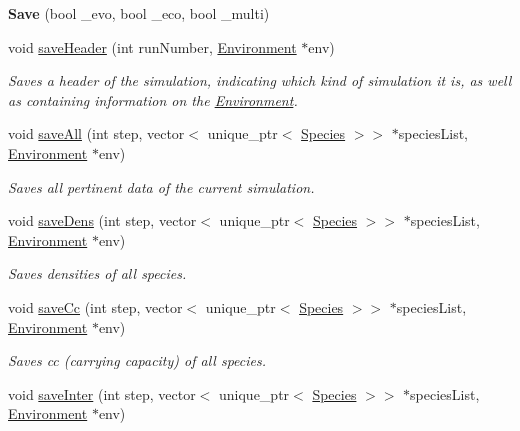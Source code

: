 \begin{DoxyCompactItemize}
\item 
\mbox{\label{classSave_af60832ca49a38a2569cc78182a2fe8e8}} 
{\bfseries Save} (bool \+\_\+evo, bool \+\_\+eco, bool \+\_\+multi)
\item 
\mbox{\label{classSave_aa59686b2d793182bb2f2d5997f4f5927}} 
void \hyperlink{classSave_aa59686b2d793182bb2f2d5997f4f5927}{save\+Header} (int run\+Number, \hyperlink{classEnvironment}{Environment} $\ast$env)
\begin{DoxyCompactList}\small\item\em Saves a header of the simulation, indicating which kind of simulation it is, as well as containing information on the \hyperlink{classEnvironment}{Environment}. \end{DoxyCompactList}\item 
void \hyperlink{classSave_ae3cf638e17bf975565ccdd5188a5c156}{save\+All} (int step, vector$<$ unique\+\_\+ptr$<$ \hyperlink{classSpecies}{Species} $>$$>$ $\ast$species\+List, \hyperlink{classEnvironment}{Environment} $\ast$env)
\begin{DoxyCompactList}\small\item\em Saves all pertinent data of the current simulation. \end{DoxyCompactList}\item 
void \hyperlink{classSave_a2e80fc292e7fcea2b327bc7016f34331}{save\+Dens} (int step, vector$<$ unique\+\_\+ptr$<$ \hyperlink{classSpecies}{Species} $>$$>$ $\ast$species\+List, \hyperlink{classEnvironment}{Environment} $\ast$env)
\begin{DoxyCompactList}\small\item\em Saves densities of all species. \end{DoxyCompactList}\item 
void \hyperlink{classSave_a76a537b2f22ae64e63ffaf00e625b955}{save\+Cc} (int step, vector$<$ unique\+\_\+ptr$<$ \hyperlink{classSpecies}{Species} $>$$>$ $\ast$species\+List, \hyperlink{classEnvironment}{Environment} $\ast$env)
\begin{DoxyCompactList}\small\item\em Saves cc (carrying capacity) of all species. \end{DoxyCompactList}\item 
void \hyperlink{classSave_af446df59d19910cd6042680d419b3948}{save\+Inter} (int step, vector$<$ unique\+\_\+ptr$<$ \hyperlink{classSpecies}{Species} $>$$>$ $\ast$species\+List, \hyperlink{classEnvironment}{Environment} $\ast$env)

\end{DoxyCompactItemize}
